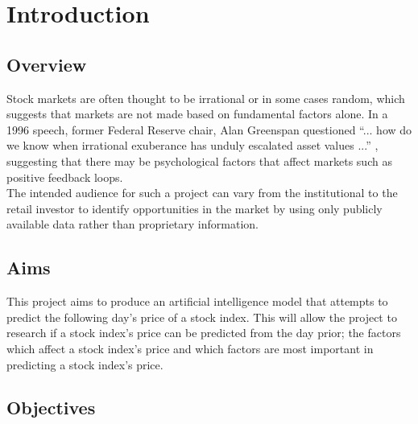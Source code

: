 \chapter{Introduction} \label{chap:introduction}

\section{Overview}

Stock markets are often thought to be irrational or in some cases random,
which suggests that markets are not made based on fundamental factors alone.
In a 1996 speech, former Federal Reserve chair, Alan Greenspan questioned ``... how do we know when irrational exuberance has unduly escalated asset
values ...'' \parencite{greenspan1996}, suggesting that there may be
psychological factors that affect markets such as positive feedback loops.\\
The intended audience for such a project can vary from the institutional to
the retail investor to identify opportunities in the market by using only
publicly available data rather than proprietary information.

\section{Aims}

This project aims to produce an artificial intelligence model that
attempts to predict the following day's price of a stock index. This will
allow the project to research if a stock index's price can be predicted
from the day prior; the factors which affect a stock index's price and which
factors are most important in predicting a stock index's price.

\section{Objectives}

